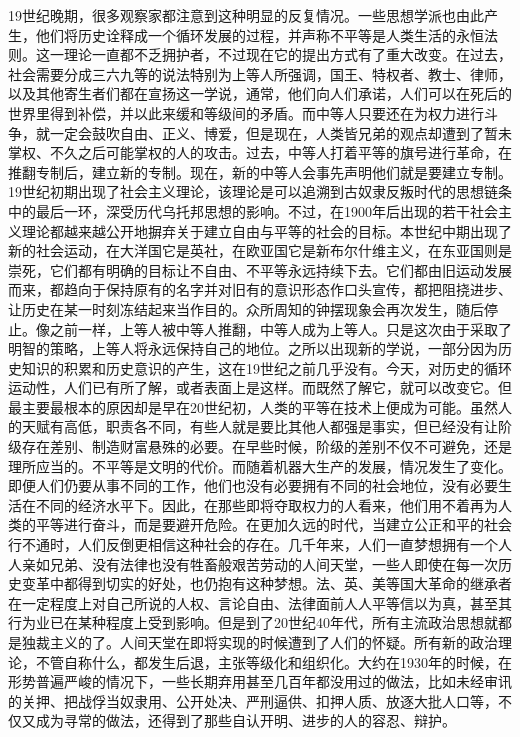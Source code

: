 19世纪晚期，很多观察家都注意到这种明显的反复情况。一些思想学派也由此产生，他们将历史诠释成一个循环发展的过程，并声称不平等是人类生活的永恒法则。这一理论一直都不乏拥护者，不过现在它的提出方式有了重大改变。在过去，社会需要分成三六九等的说法特别为上等人所强调，国王、特权者、教士、律师，以及其他寄生者们都在宣扬这一学说，通常，他们向人们承诺，人们可以在死后的世界里得到补偿，并以此来缓和等级间的矛盾。而中等人只要还在为权力进行斗争，就一定会鼓吹自由、正义、博爱，但是现在，人类皆兄弟的观点却遭到了暂未掌权、不久之后可能掌权的人的攻击。过去，中等人打着平等的旗号进行革命，在推翻专制后，建立新的专制。现在，新的中等人会事先声明他们就是要建立专制。19世纪初期出现了社会主义理论，该理论是可以追溯到古奴隶反叛时代的思想链条中的最后一环，深受历代乌托邦思想的影响。不过，在1900年后出现的若干社会主义理论都越来越公开地摒弃关于建立自由与平等的社会的目标。本世纪中期出现了新的社会运动，在大洋国它是英社，在欧亚国它是新布尔什维主义，在东亚国则是崇死，它们都有明确的目标让不自由、不平等永远持续下去。它们都由旧运动发展而来，都趋向于保持原有的名字并对旧有的意识形态作口头宣传，都把阻挠进步、让历史在某一时刻冻结起来当作目的。众所周知的钟摆现象会再次发生，随后停止。像之前一样，上等人被中等人推翻，中等人成为上等人。只是这次由于采取了明智的策略，上等人将永远保持自己的地位。之所以出现新的学说，一部分因为历史知识的积累和历史意识的产生，这在19世纪之前几乎没有。今天，对历史的循环运动性，人们已有所了解，或者表面上是这样。而既然了解它，就可以改变它。但最主要最根本的原因却是早在20世纪初，人类的平等在技术上便成为可能。虽然人的天赋有高低，职责各不同，有些人就是要比其他人都强是事实，但已经没有让阶级存在差别、制造财富悬殊的必要。在早些时候，阶级的差别不仅不可避免，还是理所应当的。不平等是文明的代价。而随着机器大生产的发展，情况发生了变化。即便人们仍要从事不同的工作，他们也没有必要拥有不同的社会地位，没有必要生活在不同的经济水平下。因此，在那些即将夺取权力的人看来，他们用不着再为人类的平等进行奋斗，而是要避开危险。在更加久远的时代，当建立公正和平的社会行不通时，人们反倒更相信这种社会的存在。几千年来，人们一直梦想拥有一个人人亲如兄弟、没有法律也没有牲畜般艰苦劳动的人间天堂，一些人即使在每一次历史变革中都得到切实的好处，也仍抱有这种梦想。法、英、美等国大革命的继承者在一定程度上对自己所说的人权、言论自由、法律面前人人平等信以为真，甚至其行为业已在某种程度上受到影响。但是到了20世纪40年代，所有主流政治思想就都是独裁主义的了。人间天堂在即将实现的时候遭到了人们的怀疑。所有新的政治理论，不管自称什么，都发生后退，主张等级化和组织化。大约在1930年的时候，在形势普遍严峻的情况下，一些长期弃用甚至几百年都没用过的做法，比如未经审讯的关押、把战俘当奴隶用、公开处决、严刑逼供、扣押人质、放逐大批人口等，不仅又成为寻常的做法，还得到了那些自认开明、进步的人的容忍、辩护。

